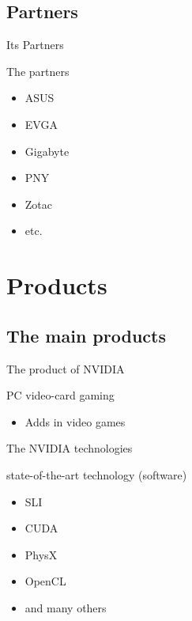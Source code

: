 \documentclass{beamer}
\begin{document}
\subsection{Partners}
\begin{frame}{Its Partners}
	\begin{block}{The partners}
		\begin{itemize}
			\item<+->{ASUS}
			\item<+->{EVGA}
			\item<+->{Gigabyte}
			\item<+->{PNY}
			\item<+->{Zotac}
			\item<+->{etc.}
		\end{itemize}
	\end{block}
\end{frame}

\section{Products}
\subsection{The main products}
\begin{frame}{The product of NVIDIA}
	\transdissolve[duration=0.1]
	\begin{block}{PC video-card gaming}
		\begin{itemize}
			\item<+->{Adds in video games}
		\end{itemize}
	\end{block}
\end{frame}

\begin{frame}{The NVIDIA technologies}
	\transdissolve[duration=0.1]
	\begin{block}{state-of-the-art technology (software)}
		\begin{itemize}
			\item<+->{SLI}
			\item<+->{CUDA}
			\item<+->{PhysX}
			\item<+->{OpenCL}
			\item<+->{and many others}
		\end{itemize}
	\end{block}
\end{frame}
\end{document}
